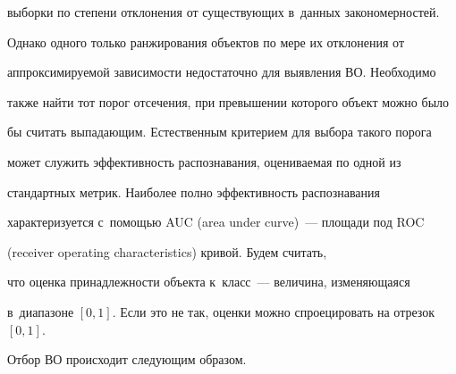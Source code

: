 выборки по степени отклонения от существующих в~данных закономерностей.



  Однако одного только ранжирования объектов по мере их отклонения от 

аппроксимируемой зависимости недостаточно для выявления ВО. Необходимо 

также найти тот порог отсечения, при превышении которого объект можно было 

бы считать выпадающим. Естественным критерием для выбора такого порога 

может служить эффективность распознавания, оцениваемая по одной из 

стандартных метрик. Наиболее полно эффективность распознавания 

характеризуется с~помощью AUC (area under curve)~--- площади под ROC

(receiver operating characteristics) кри\-вой. Будем считать, 

что оценка принадлежности объекта к~класс~--- величина, изменяющаяся 

в~диапазоне $[0, 1]$. Если это не так, оценки можно спроецировать на отрезок $[0, 

1].$

  

Отбор ВО происходит следующим образом.

